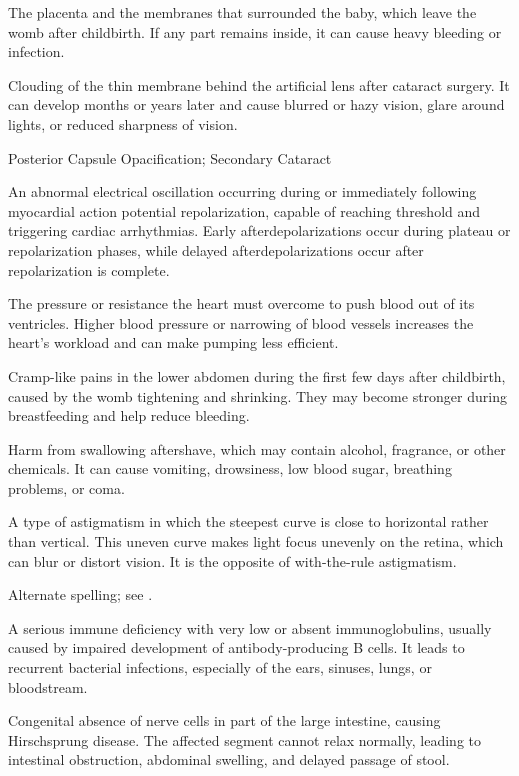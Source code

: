  The placenta and the membranes that surrounded the baby, which leave the womb after childbirth. If any part remains inside, it can cause heavy bleeding or infection.

 Clouding of the thin membrane behind the artificial lens after cataract surgery. It can develop months or years later and cause blurred or hazy vision, glare around lights, or reduced sharpness of vision.

\synonyms
Posterior Capsule Opacification; Secondary Cataract

 An abnormal electrical oscillation occurring during or immediately following myocardial action potential repolarization, capable of reaching threshold and triggering cardiac arrhythmias. Early afterdepolarizations occur during plateau or repolarization phases, while delayed afterdepolarizations occur after repolarization is complete.

 The pressure or resistance the heart must overcome to push blood out of its ventricles. Higher blood pressure or narrowing of blood vessels increases the heart’s workload and can make pumping less efficient.

 Cramp-like pains in the lower abdomen during the first few days after childbirth, caused by the womb tightening and shrinking. They may become stronger during breastfeeding and help reduce bleeding.

 Harm from swallowing aftershave, which may contain alcohol, fragrance, or other chemicals. It can cause vomiting, drowsiness, low blood sugar, breathing problems, or coma.

 A type of astigmatism in which the
steepest curve is close to horizontal rather than vertical. This uneven curve
makes light focus unevenly on the retina, which can blur or distort vision. It
is the opposite of with-the-rule astigmatism.

 Alternate spelling; see .

 A serious immune deficiency with very low or absent immunoglobulins, usually caused by impaired development of antibody-producing B cells. It leads to recurrent bacterial infections, especially of the ears, sinuses, lungs, or bloodstream.

 Congenital absence of nerve cells in part of the large intestine, causing Hirschsprung disease. The affected segment cannot relax normally, leading to intestinal obstruction, abdominal swelling, and delayed passage of stool.

